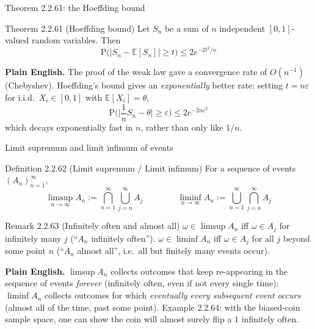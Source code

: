 \documentclass[aspectratio=169,10pt]{beamer}
\begin{document}
\begin{frame}{Theorem 2.2.61: the Hoeffding bound}
\begin{block}{Theorem 2.2.61 (Hoeffding bound)}
Let $S_n$ be a sum of $n$ independent $[0,1]$-valued random variables. Then
\[ \mathrm{P}\big(|S_n-\mathbb{E}[S_n]|\geq t\big) \leq 2e^{-2t^2/n} \]
\end{block}
\textbf{Plain English.} The proof of the weak law gave a convergence rate of
$O(n^{-1})$ (Chebyshev). Hoeffding's bound gives an \emph{exponentially}
better rate: setting $t=n\varepsilon$ for i.i.d.\ $X_i\in[0,1]$ with
$\mathbb{E}[X_i]=\theta$,
\[ \mathrm{P}\Big(\Big|\frac1n S_n-\theta\Big|\geq\varepsilon\Big) \leq 2e^{-2n\varepsilon^2} \]
which decays exponentially fast in $n$, rather than only like $1/n$.
\end{frame}

\begin{frame}{Limit supremum and limit infimum of events}
\begin{block}{Definition 2.2.62 (Limit supremum / Limit infimum)}
For a sequence of events $(A_n)_{n=1}^\infty$,
\[ \limsup_{n\to\infty}A_n := \bigcap_{n=1}^{\infty}\bigcup_{j=n}^{\infty}A_j
\qquad\qquad
\liminf_{n\to\infty}A_n := \bigcup_{n=1}^{\infty}\bigcap_{j=n}^{\infty}A_j \]
\end{block}
\begin{block}{Remark 2.2.63 (Infinitely often and almost all)}
$\omega\in\limsup A_n$ iff $\omega\in A_j$ for infinitely many $j$
(``$A_n$ infinitely often''). $\omega\in\liminf A_n$ iff $\omega\in A_j$ for
all $j$ beyond some point $n$ (``$A_n$ almost all'', i.e.\ all but finitely
many events occur).
\end{block}
\textbf{Plain English.} $\limsup A_n$ collects outcomes that keep
re-appearing in the sequence of events \emph{forever} (infinitely often,
even if not every single time); $\liminf A_n$ collects outcomes for which
\emph{eventually every subsequent event occurs} (almost all of the time,
past some point). Example 2.2.64: with the biased-coin sample space, one can
show the coin will almost surely flip a $1$ infinitely often.
\end{frame}
\end{document}
